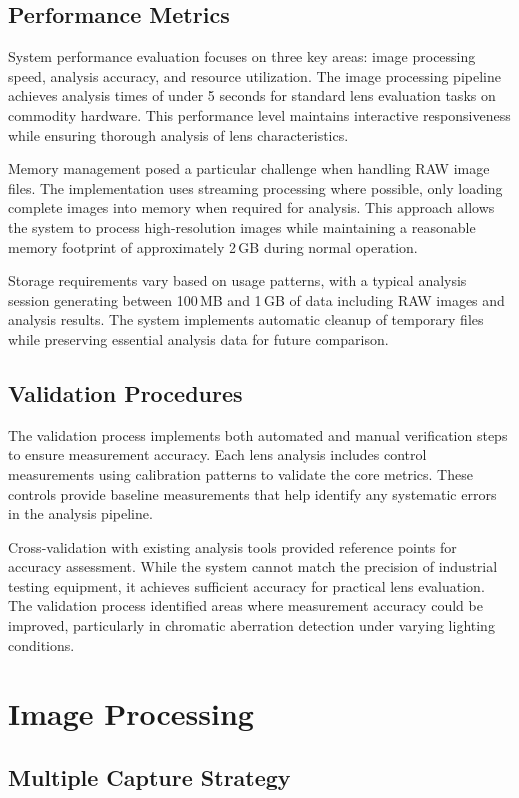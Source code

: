 \subsection{Performance Metrics}
System performance evaluation focuses on three key areas: image processing speed, analysis accuracy, and resource utilization. The image processing pipeline achieves analysis times of under 5 seconds for standard lens evaluation tasks on commodity hardware. This performance level maintains interactive responsiveness while ensuring thorough analysis of lens characteristics.

Memory management posed a particular challenge when handling RAW image files. The implementation uses streaming processing where possible, only loading complete images into memory when required for analysis. This approach allows the system to process high-resolution images while maintaining a reasonable memory footprint of approximately 2\,GB during normal operation.

Storage requirements vary based on usage patterns, with a typical analysis session generating between 100\,MB and 1\,GB of data including RAW images and analysis results. The system implements automatic cleanup of temporary files while preserving essential analysis data for future comparison.

\subsection{Validation Procedures} 
The validation process implements both automated and manual verification steps to ensure measurement accuracy. Each lens analysis includes control measurements using calibration patterns to validate the core metrics. These controls provide baseline measurements that help identify any systematic errors in the analysis pipeline.

Cross-validation with existing analysis tools provided reference points for accuracy assessment. While the system cannot match the precision of industrial testing equipment, it achieves sufficient accuracy for practical lens evaluation. The validation process identified areas where measurement accuracy could be improved, particularly in chromatic aberration detection under varying lighting conditions.

\section{Image Processing}

\subsection{Multiple Capture Strategy}

